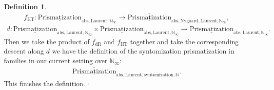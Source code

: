 \documentclass[12pt]{article}
\theoremstyle{definition}
\newtheorem{definition}{Definition}
\begin{document}
\begin{definition}
\begin{align}
f_\mathrm{HT}: {\underline{\mathrm{Prismatization}}}_{\mathrm{abs},\mathrm{Laurent},\mathbb{N}_\infty}\rightarrow \overline{\underline{\mathrm{Prismatization}}}_{\mathrm{abs},\mathrm{Nygaard},\mathrm{Laurent},\mathbb{N}_\infty},
\end{align}
\begin{align}
d:  {\underline{\mathrm{Prismatization}}}_{\mathrm{abs},\mathrm{Laurent},\mathbb{N}_\infty}\times {\underline{\mathrm{Prismatization}}}_{\mathrm{abs},\mathrm{Laurent},\mathbb{N}_\infty} \rightarrow {\underline{\mathrm{Prismatization}}}_{\mathrm{abs},\mathrm{Laurent},\mathbb{N}_\infty}.
\end{align}
Then we take the product of $f_\mathrm{dR}$ and $f_\mathrm{HT}$ together and take the corresponding descent along $d$ we have the definition of the syntomization prismatization in families in our current setting over $\mathbb{N}_\infty$:
\begin{align}
\overline{\underline{\mathrm{Prismatization}}}_{\mathrm{abs},\mathrm{Laurent},\mathrm{syntomization},\mathbb{N}}. 
\end{align}
This finishes the definition. $\square$
\end{definition}
\end{document}
